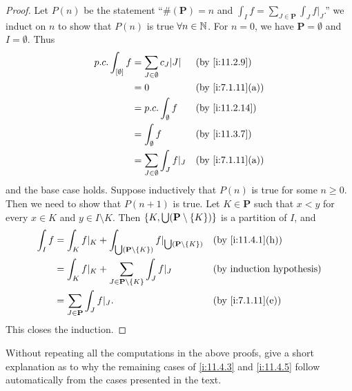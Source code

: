 \begin{proof}
  Let \(P(n)\) be the statement ``\(\#(\mathbf{P}) = n\) and \(\int_I f = \sum_{J \in \mathbf{P}} \int_J f|_J\).''
  we induct on \(n\) to show that \(P(n)\) is true \(\forall n \in \mathbb{N}\).
  For \(n = 0\), we have \(\mathbf{P} = \emptyset\) and \(I = \emptyset\).
  Thus
  \begin{align*}
    p.c. \int_{[\emptyset]} f & = \sum_{J \in \emptyset} c_J \abs{J} &  & \by{i:11.2.9}    \\
                              & = 0                                  &  & \by{i:7.1.11}[a] \\
                              & = p.c. \int_{\emptyset} f            &  & \by{i:11.2.14}   \\
                              & = \int_{\emptyset} f                 &  & \by{i:11.3.7}    \\
                              & = \sum_{J \in \emptyset} \int_J f|_J &  & \by{i:7.1.11}[a]
  \end{align*}
  and the base case holds.
  Suppose inductively that \(P(n)\) is true for some \(n \geq 0\).
  Then we need to show that \(P(n + 1)\) is true.
  Let \(K \in \mathbf{P}\) such that \(x < y\) for every \(x \in K\) and \(y \in I \setminus K\).
  Then \(\left\lbrace K, \bigcup (\mathbf{P} \setminus \left\lbrace K\right\rbrace)\right\rbrace\) is a partition of \(I\), and
  \begin{align*}
    \int_I f & = \int_K f|_K + \int_{\bigcup (\mathbf{P} \setminus \set{K})} f|_{\bigcup (\mathbf{P} \setminus \set{K})} &  & \by{i:11.4.1}[h] \\
             & = \int_K f|_K + \sum_{J \in \mathbf{P} \setminus \set{K}} \int_J f|_J                                     &  & \byIH            \\
             & = \sum_{J \in \mathbf{P}} \int_J f|_J.                                                                    &  & \by{i:7.1.11}[e]
  \end{align*}
  This closes the induction.
\end{proof}

\begin{ex}\label{i:ex:11.4.4}
  Without repeating all the computations in the above proofs, give a short explanation as to why the remaining cases of \cref{i:11.4.3} and \cref{i:11.4.5} follow automatically from the cases presented in the text.
\end{ex}

